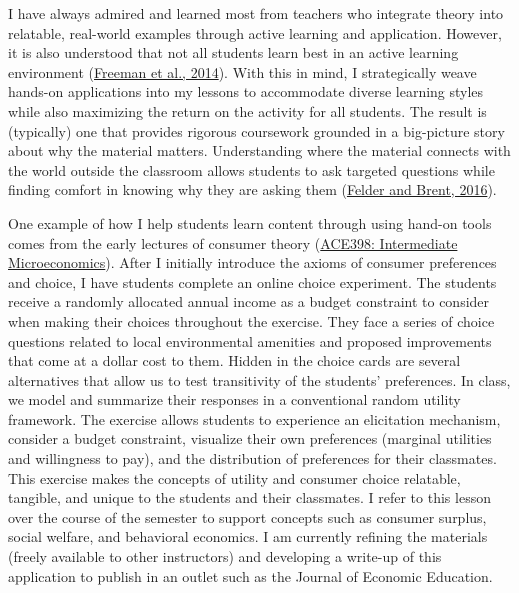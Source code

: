 \documentclass[12pt]{article}
\begin{document}



\vspace{1em}
\RaggedRight

\noindent I have always admired and learned most from teachers who integrate theory into relatable, real-world examples through active learning and application. However, it is also understood that not all students learn best in an active learning environment (\href{https://www.pnas.org/content/111/23/8410}{Freeman et al., 2014}). With this in mind, I strategically weave hands-on applications into my lessons to accommodate diverse learning styles while also maximizing the return on the activity for all students. The result is (typically) one that provides rigorous coursework grounded in a big-picture story about why the material matters. Understanding where the material connects with the world outside the classroom allows students to ask targeted questions while finding comfort in knowing why they are asking them (\href{https://www.wiley.com/en-us/Teaching+and+Learning+STEM\%3A+A+Practical+Guide-p-9781118925812}{Felder and Brent, 2016}).

One example of how I help students learn content through using hand-on tools comes from the early lectures of consumer theory (\href{https://bryanparthum.s3.us-east-2.amazonaws.com/Syllabus_Intermediate_Micro.pdf}{ACE398: Intermediate Microeconomics}). After I initially introduce the axioms of consumer preferences and choice, I have students complete an online choice experiment. The students receive a randomly allocated annual income as a budget constraint to consider when making their choices throughout the exercise. They face a series of choice questions related to local environmental amenities and proposed improvements that come at a dollar cost to them. Hidden in the choice cards are several alternatives that allow us to test transitivity of the students' preferences. In class, we model and summarize their responses in a conventional random utility framework. The exercise allows students to experience an elicitation mechanism, consider a budget constraint, visualize their own preferences (marginal utilities and willingness to pay), and the distribution of preferences for their classmates. This exercise makes the concepts of utility and consumer choice relatable, tangible, and unique to the students and their classmates. I refer to this lesson over the course of the semester to support concepts such as consumer surplus, social welfare, and behavioral economics. I am currently refining the materials (freely available to other instructors) and developing a write-up of this application to publish in an outlet such as the Journal of Economic Education.
\end{document}
